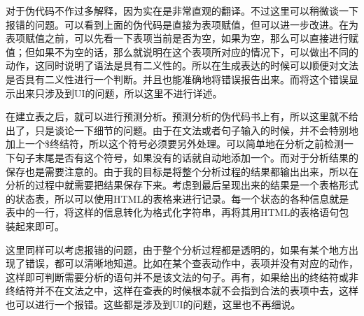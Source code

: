 对于伪代码不作过多解释，因为实在是非常直观的翻译。不过这里可以稍微谈一下报错的问题。可以看到上面的伪代码是直接为表项赋值，但可以进一步改进。在为表项赋值之前，可以先看一下表项当前是否为空，如果为空，那么可以直接进行赋值；但如果不为空的话，那么就说明在这个表项所对应的情况下，可以做出不同的动作，这同时说明了语法是具有二义性的。所以在生成表达的时候可以顺便对文法是否具有二义性进行一个判断。并且也能准确地将错误报告出来。而将这个错误显示出来只涉及到UI的问题，所以这里不进行详述。

在建立表之后，就可以进行预测分析。预测分析的伪代码书上有，所以这里就不给出了，只是谈论一下细节的问题。由于在文法或者句子输入的时候，并不会特别地加上一个\$终结符，所以这个符号必须要另外处理。可以简单地在分析之前检测一下句子末尾是否有这个符号，如果没有的话就自动地添加一个。而对于分析结果的保存也是需要注意的。由于我的目标是将整个分析过程的结果都输出出来，所以在分析的过程中就需要把结果保存下来。考虑到最后呈现出来的结果是一个表格形式的状态表，所以可以使用HTML的表格来进行记录。每一个状态的各种信息就是表中的一行，将这样的信息转化为格式化字符串，再将其用HTML的表格语句包装起来即可。

这里同样可以考虑报错的问题，由于整个分析过程都是透明的，如果有某个地方出现了错误，都可以清晰地知道。比如在某个查表动作中，表项并没有对应的动作，这样即可判断需要分析的语句并不是该文法的句子。再有，如果给出的终结符或非终结符并不在文法之中，这样在查表的时候根本就不会指到合法的表项中去，这样也可以进行一个报错。这些都是涉及到UI的问题，这里也不再细说。


\newpage

